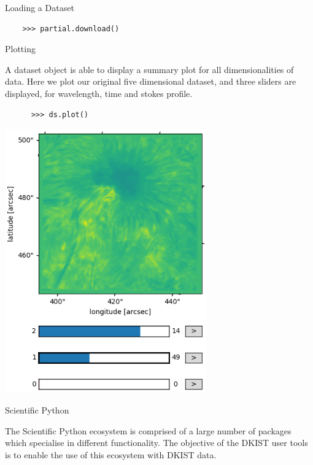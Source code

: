 \documentclass[landscape,a0paper,fontscale=0.32]{baposter}
\begin{document}
\begin{poster}
\begin{posterbox}[name=dataset,column=2,row=0,span=2]{Loading a Dataset}
  \begin{verbatim}
    >>> partial.download()
  \end{verbatim}

  
\end{posterbox}

\begin{posterbox}[name=scipy,column=2,row=0,span=1,below=dataset]{Plotting}

  A dataset object is able to display a summary plot for all dimensionalities of
  data. Here we plot our original five dimensional dataset, and three sliders
  are displayed, for wavelength, time and stokes profile.

  \begin{verbatim}
      >>> ds.plot()
  \end{verbatim}

  \begin{center}
    \includegraphics[width=0.65\textwidth]{5d-animator.png}
  \end{center}
  
\end{posterbox}

\begin{posterbox}[name=scipy,column=3,row=0,span=1,below=dataset]{Scientific Python}

  The Scientific Python ecosystem is comprised of a large number of packages
  which specialise in different functionality. The objective of the DKIST user
  tools is to enable the use of this ecosystem with DKIST data.
  

\end{posterbox}
\end{poster}
\end{document}
